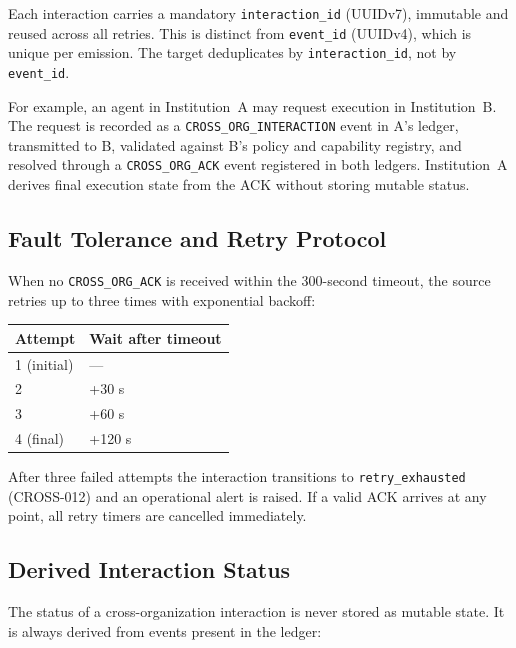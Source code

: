 \documentclass[11pt]{article}
\theoremstyle{definition}
\begin{document}
Each interaction carries a mandatory \texttt{interaction\_id} (UUIDv7), immutable and
reused across all retries.
This is distinct from \texttt{event\_id} (UUIDv4), which is unique per emission.
The target deduplicates by \texttt{interaction\_id}, not by \texttt{event\_id}.

For example, an agent in Institution~A may request execution in Institution~B.
The request is recorded as a \texttt{CROSS\_ORG\_INTERACTION} event in A's ledger,
transmitted to B, validated against B's policy and capability registry,
and resolved through a \texttt{CROSS\_ORG\_ACK} event registered in both ledgers.
Institution~A derives final execution state from the ACK without storing mutable status.

\subsection{Fault Tolerance and Retry Protocol}

When no \texttt{CROSS\_ORG\_ACK} is received within the 300-second timeout,
the source retries up to three times with exponential backoff:

\begin{center}
\begin{tabular}{@{}ll@{}}
\toprule
\textbf{Attempt} & \textbf{Wait after timeout} \\
\midrule
1 (initial) & --- \\
2 & +30 s \\
3 & +60 s \\
4 (final) & +120 s \\
\bottomrule
\end{tabular}
\end{center}

After three failed attempts the interaction transitions to \texttt{retry\_exhausted}
(CROSS-012) and an operational alert is raised.
If a valid ACK arrives at any point, all retry timers are cancelled immediately.

\subsection{Derived Interaction Status}

The status of a cross-organization interaction is never stored as mutable state.
It is always derived from events present in the ledger:
\end{document}
